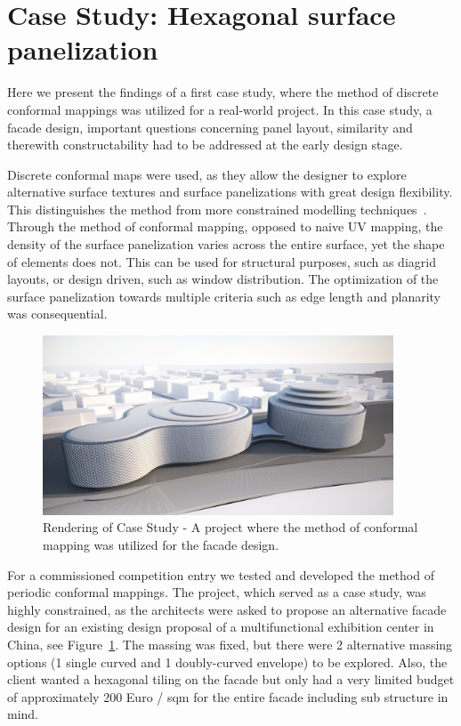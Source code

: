 \documentclass[article.tex]{subfiles}
\begin{document}
\section{Case Study: Hexagonal surface panelization}
\label{sec:panelization}
Here we present the findings of a first case study, where the method
of discrete conformal mappings was utilized for a real-world project.
In this case study, a facade design, important questions concerning
panel layout, similarity and therewith constructability had to be
addressed at the early design stage.

Discrete conformal maps were used, as they allow the designer to
explore alternative surface textures and surface panelizations with
great design flexibility. This distinguishes the method from more
constrained modelling techniques~\cite{Ceccato}. Through the method of
conformal mapping, opposed to naive UV mapping, the density of the
surface panelization varies across the entire surface, yet the shape
of elements does not. This can be used for structural purposes, such
as diagrid layouts, or design driven, such as window distribution. The
optimization of the surface panelization towards multiple criteria
such as edge length and planarity was consequential.

\begin{figure}[t]
  \centering
  \includegraphics[width=0.93\textwidth]{images/henn/overview02.jpg}
  \caption{Rendering of Case Study - A project where the method of conformal mapping was utilized for the facade design.}
  \label{fig:overview02}
\end{figure}

For a commissioned competition entry we tested and developed the
method of periodic conformal mappings. The project, which served as a
case study, was highly constrained, as the architects were asked to
propose an alternative facade design for an existing design proposal
of a multifunctional exhibition center in China, see
Figure~\ref{fig:overview02}. The massing was fixed, but there were 2
alternative massing options (1 single curved and 1 doubly-curved
envelope) to be explored. Also, the client wanted a hexagonal tiling
on the facade but only had a very limited budget of approximately 200
Euro / sqm for the entire facade including sub structure in mind.
\end{document}
